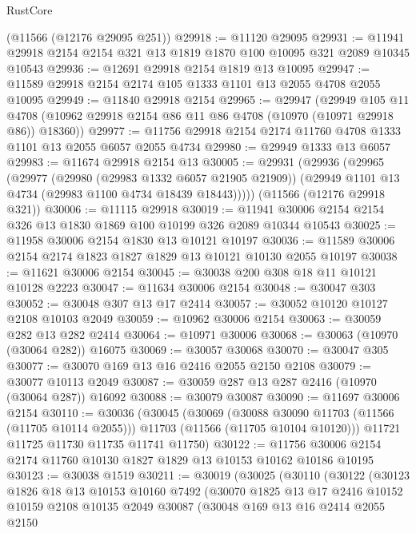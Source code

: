 \begin{lexlean}{RustCore}
\begin{coremodule}
    (@11566 (@12176 @29095 @251))
@29918 := @11120 @29095
@29931 := @11941 @29918 @2154 @2154 @321 @13 @1819 @1870 @100 @10095 @321 @2089 @10345 @10543
@29936 := @12691 @29918 @2154 @1819 @13 @10095
@29947 := @11589 @29918 @2154 @2174 @105 @1333 @1101 @13 @2055 @4708 @2055 @10095
@29949 := @11840 @29918 @2154
@29965 := @29947
    (@29949
      @105
      @11
      @4708
      (@10962 @29918 @2154 @86 @11 @86 @4708 (@10970 (@10971 @29918 @86)) @18360))
@29977 := @11756 @29918 @2154 @2174 @11760 @4708 @1333 @1101 @13 @2055 @6057 @2055 @4734
@29980 := @29949 @1333 @13 @6057
@29983 := @11674 @29918 @2154 @13
@30005 := @29931
    (@29936
      (@29965
        (@29977
          (@29980 (@29983 @1332 @6057 @21905 @21909))
          (@29949 @1101 @13 @4734 (@29983 @1100 @4734 @18439 @18443)))))
    (@11566 (@12176 @29918 @321))
@30006 := @11115 @29918
@30019 := @11941 @30006 @2154 @2154 @326 @13 @1830 @1869 @100 @10199 @326 @2089 @10344 @10543
@30025 := @11958 @30006 @2154 @1830 @13 @10121 @10197
@30036 := @11589 @30006 @2154 @2174 @1823 @1827 @1829 @13 @10121 @10130 @2055 @10197
@30038 := @11621 @30006 @2154
@30045 := @30038 @200 @308 @18 @11 @10121 @10128 @2223
@30047 := @11634 @30006 @2154
@30048 := @30047 @303
@30052 := @30048 @307 @13 @17 @2414
@30057 := @30052 @10120 @10127 @2108 @10103 @2049
@30059 := @10962 @30006 @2154
@30063 := @30059 @282 @13 @282 @2414
@30064 := @10971 @30006
@30068 := @30063 (@10970 (@30064 @282)) @16075
@30069 := @30057 @30068
@30070 := @30047 @305
@30077 := @30070 @169 @13 @16 @2416 @2055 @2150 @2108
@30079 := @30077 @10113 @2049
@30087 := @30059 @287 @13 @287 @2416 (@10970 (@30064 @287)) @16092
@30088 := @30079 @30087
@30090 := @11697 @30006 @2154
@30110 := @30036
    (@30045
      (@30069
        (@30088 @30090 @11703 (@11566 (@11705 @10114 @2055)))
        @11703
        (@11566 (@11705 @10104 @10120)))
      @11721
      @11725
      @11730
      @11735
      @11741
      @11750)
@30122 := @11756 @30006 @2154 @2174 @11760 @10130 @1827 @1829 @13 @10153 @10162 @10186 @10195
@30123 := @30038 @1519
@30211 := @30019
    (@30025
      (@30110
        (@30122
          (@30123
            @1826
            @18
            @13
            @10153
            @10160
            @7492
            (@30070
              @1825
              @13
              @17
              @2416
              @10152
              @10159
              @2108
              @10135
              @2049
              @30087
              (@30048
                @169
                @13
                @16
                @2414
                @2055
                @2150

\end{coremodule}
\end{lexlean}

